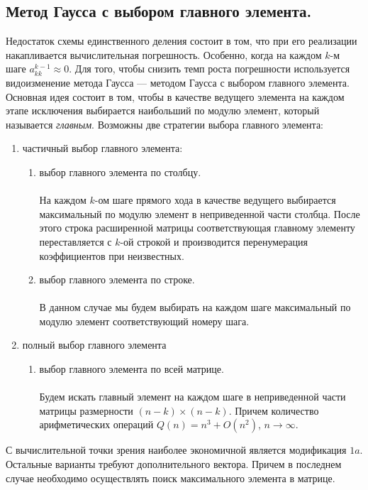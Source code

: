 \documentclass[a4paper, 12pt]{report}
\begin{document}
	\subsection{Метод Гаусса с выбором главного элемента.}
	Недостаток схемы единственного деления состоит в том, что при его реализации накапливается вычислительная погрешность. Особенно, когда на каждом $k$-м шаге $a_{kk}^{k-1}\approx 0$. Для того, чтобы снизить темп роста погрешности используется видоизменение метода Гаусса --- методом Гаусса с выбором главного элемента. Основная идея состоит в том, чтобы в качестве ведущего элемента на каждом этапе исключения выбирается наибольший по модулю элемент, который называется \textit{главным}. Возможны две стратегии выбора главного элемента:
	\begin{enumerate}
		\item частичный выбор главного элемента:
		\begin{enumerate}
			\item выбор главного элемента по столбцу.\\\\
			На каждом $k$-ом шаге прямого хода в качестве ведущего выбирается максимальный по модулю элемент в неприведенной части столбца. После этого строка расширенной матрицы соответствующая главному элементу переставляется с $k$-ой строкой и производится перенумерация коэффициентов при неизвестных.
			\item выбор главного элемента по строке.\\\\
			В данном случае мы будем выбирать на каждом шаге максимальный по модулю элемент соответствующий номеру шага.
		\end{enumerate}
		\item полный выбор главного элемента\begin{enumerate}
			\item выбор главного элемента по всей матрице.\\\\
			Будем искать главный элемент на каждом шаге в неприведенной части матрицы размерности $(n-k)\times(n-k)$. Причем количество арифметических операций $Q(n) = n^3 + O(n^2)$, $n\to \infty$.
		\end{enumerate}
	\end{enumerate}
	С вычислительной точки зрения наиболее экономичной является модификация $1a$. Остальные варианты требуют дополнительного вектора. Причем в последнем случае необходимо осуществлять поиск максимального элемента в матрице. 
\end{document}

